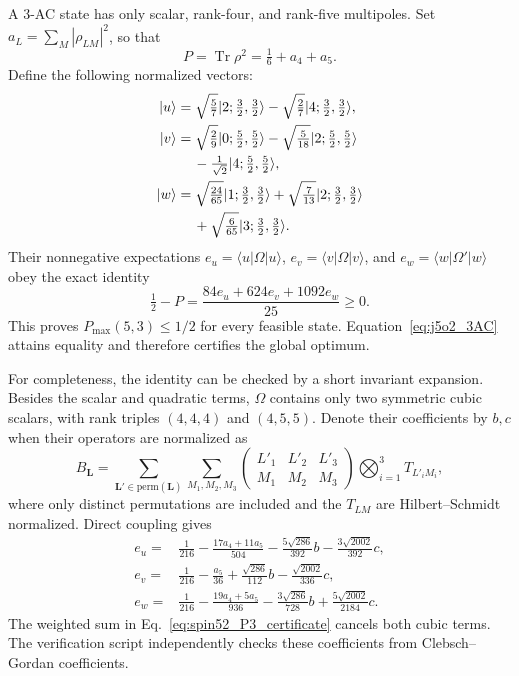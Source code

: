 \documentclass[11pt]{article}
\DeclareMathOperator{\Tr}{Tr}
\begin{document}
A $3$-AC state has only scalar, rank-four, and rank-five multipoles. Set $a_L=\sum_M|\rho_{LM}|^2$, so that
\begin{equation}
 P=\Tr\rho^2=\tfrac16+a_4+a_5.
\end{equation}
Define the following normalized vectors:
\begin{align}
 |u\rangle&=\sqrt{\tfrac57}|2;\tfrac32,\tfrac32\rangle
 -\sqrt{\tfrac27}|4;\tfrac32,\tfrac32\rangle,\\
 |v\rangle&=\sqrt{\tfrac29}|0;\tfrac52,\tfrac52\rangle
 -\sqrt{\tfrac5{18}}|2;\tfrac52,\tfrac52\rangle\nonumber\\
 &\hspace{1.2em}-\tfrac1{\sqrt2}|4;\tfrac52,\tfrac52\rangle,\\
 |w\rangle&=\sqrt{\tfrac{24}{65}}|1;\tfrac32,\tfrac32\rangle
 +\sqrt{\tfrac7{13}}|2;\tfrac32,\tfrac32\rangle\nonumber\\
 &\hspace{1.2em}+\sqrt{\tfrac6{65}}|3;\tfrac32,\tfrac32\rangle.
\end{align}
Their nonnegative expectations $e_u=\langle u|\Omega|u\rangle$, $e_v=\langle v|\Omega|v\rangle$, and $e_w=\langle w|\Omega'|w\rangle$ obey the exact identity
\begin{equation}\label{eq:spin52_P3_certificate}
 \boxed{\quad\tfrac12-P
 =\frac{84e_u+624e_v+1092e_w}{25}\ge0.\quad}
\end{equation}
This proves $P_{\max}(5,3)\le1/2$ for every feasible state. Equation~\eqref{eq:j5o2_3AC} attains equality and therefore certifies the global optimum.

For completeness, the identity can be checked by a short invariant expansion. Besides the scalar and quadratic terms, $\Omega$ contains only two symmetric cubic scalars, with rank triples $(4,4,4)$ and $(4,5,5)$. Denote their coefficients by $b,c$ when their operators are normalized as
\begin{equation}
 B_{\boldsymbol L}=\sum_{\boldsymbol L'\in\mathrm{perm}(\boldsymbol L)}
 \sum_{M_1,M_2,M_3}
 \begin{pmatrix}L'_1&L'_2&L'_3\\M_1&M_2&M_3\end{pmatrix}
 \bigotimes_{i=1}^3T_{L'_iM_i},
\end{equation}
where only distinct permutations are included and the $T_{LM}$ are Hilbert--Schmidt normalized. Direct coupling gives
\begin{align}
 e_u={}&\tfrac1{216}-\tfrac{17a_4+11a_5}{504}
 -\tfrac{5\sqrt{286}}{392}b-\tfrac{3\sqrt{2002}}{392}c,\\
 e_v={}&\tfrac1{216}-\tfrac{a_5}{36}
 +\tfrac{\sqrt{286}}{112}b-\tfrac{\sqrt{2002}}{336}c,\\
 e_w={}&\tfrac1{216}-\tfrac{19a_4+5a_5}{936}
 -\tfrac{3\sqrt{286}}{728}b+\tfrac{5\sqrt{2002}}{2184}c.
\end{align}
The weighted sum in Eq.~\eqref{eq:spin52_P3_certificate} cancels both cubic terms. The verification script independently checks these coefficients from Clebsch--Gordan coefficients.
\end{document}
